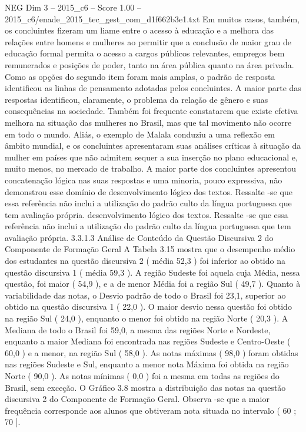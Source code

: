 \begin{textsample}{NEG Dim 3 – 2015\_c6 – Score 1.00 – 2015\_c6/enade\_2015\_tec\_gest\_com\_d1f662b3e1.txt}
Em muitos casos, também, os concluintes fizeram um liame entre o acesso à educação e a melhora das relações entre homens e mulheres ao permitir que a conclusão de maior grau de educação formal permita o acesso a cargos públicos relevantes, empregos bem remunerados e posições de poder, tanto na área pública quanto na área privada.
Como as opções do segundo item foram mais amplas, o padrão de resposta identificou as linhas de pensamento adotadas pelos concluintes.
A maior parte das respostas identificou, claramente, o problema da relação de gênero e suas consequências na sociedade.
Também foi frequente constatarem que existe efetiva melhora na situação das mulheres no Brasil, mas que tal movimento não ocorre em todo o mundo.
Aliás, o exemplo de Malala conduziu a uma reflexão em âmbito mundial, e os concluintes apresentaram suas análises críticas à situação da mulher em países que não admitem sequer a sua inserção no plano educacional e, muito menos, no mercado de trabalho.
A maior parte dos concluintes apresentou concatenação lógica nas suas respostas e uma minoria, pouco expressiva, não demonstrou esse domínio de desenvolvimento lógico dos textos.
Ressalte -se que essa referência não inclui a utilização do padrão culto da língua portuguesa que tem avaliação própria. desenvolvimento lógico dos textos.
Ressalte -se que essa referência não inclui a utilização do padrão culto da língua portuguesa que tem avaliação própria. 3.3.1.3 Análise de Conteúdo da Questão Discursiva 2 do Componente de Formação Geral A Tabela 3.15 mostra que o desempenho médio dos estudantes na questão discursiva 2 ( média 52,3 ) foi inferior ao obtido na questão discursiva 1 ( média 59,3 ).
A região Sudeste foi aquela cuja Média, nessa questão, foi maior ( 54,9 ), e a de menor Média foi a região Sul ( 49,7 ).
Quanto à variabilidade das notas, o Desvio padrão de todo o Brasil foi 23,1, superior ao obtido na questão discursiva 1 ( 22,0 ).
O maior desvio nessa questão foi obtido na região Sul ( 24,0 ), enquanto o menor foi obtido na região Norte ( 20,3 ).
A Mediana de todo o Brasil foi 59,0, a mesma das regiões Norte e Nordeste, enquanto a maior Mediana foi encontrada nas regiões Sudeste e Centro-Oeste ( 60,0 ) e a menor, na região Sul ( 58,0 ).
As notas máximas ( 98,0 ) foram obtidas nas regiões Sudeste e Sul, enquanto a menor nota Máxima foi obtida na região Norte ( 90,0 ).
As notas mínimas ( 0,0 ) foi a mesma em todas as regiões do Brasil, sem exceção.
O Gráfico 3.8 mostra a distribuição das notas na questão discursiva 2 do Componente de Formação Geral.
Observa -se que a maior frequência corresponde aos alunos que obtiveram nota situada no intervalo ( 60 ; 70 ].

\end{textsample}
